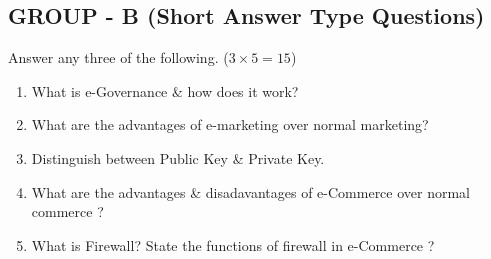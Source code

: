\documentclass{article}
\begin{document}
\subsection*{GROUP - B (Short Answer Type Questions)}
Answer any three of the following. ($3 \times 5 = 15$)
\begin{enumerate}
    \item[2.] What is e-Governance \& how does it work?
    \item[3.] What are the advantages of e-marketing over normal marketing?
    \item[4.] Distinguish between Public Key \& Private Key.
    \item[5.] What are the advantages \& disadavantages of e-Commerce over normal commerce ?
    \item[6.] What is Firewall? State the functions of firewall in e-Commerce ?
\end{enumerate}
\end{document}
